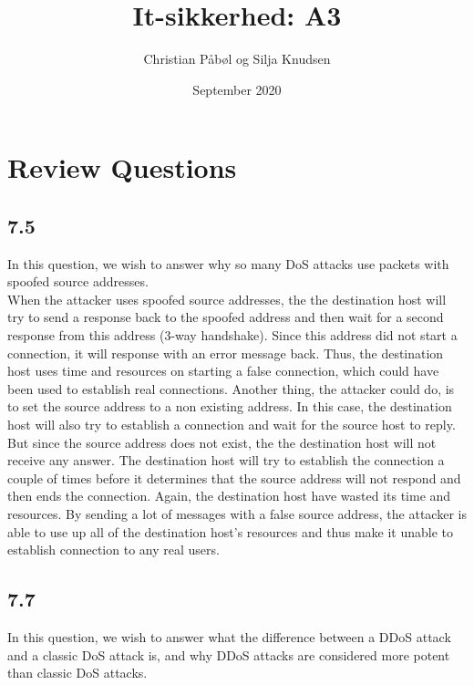 \documentclass{article}
\title{It-sikkerhed: A3}
\author{Christian Påbøl og Silja Knudsen }
\date{September 2020}
\begin{document}
\maketitle

\section{Review Questions}
\subsection{7.5}
In this question, we wish to answer why so many DoS attacks use packets with spoofed source addresses.\\

When the attacker uses spoofed source addresses, the the destination host will try to send a response back to the spoofed address and then wait for a second response from this address (3-way handshake). Since this address did not start a connection, it will response with an error message back. Thus, the destination host  uses time and resources on starting a false connection, which could have been used to establish real connections. 
Another thing, the attacker could do, is to set the source address to a non existing address. In this case, the destination host will also try to establish a connection and wait for the source host to reply. But since the source address does not exist, the the destination host will not receive any answer. The destination host will try to establish the connection a couple of times before it determines that the source address will not respond and then ends the connection. Again, the destination host have wasted its time and resources. By sending a lot of messages with a false source address, the attacker is able to use up all of the destination host's resources and thus make it unable to establish connection to any real users.


\subsection{7.7}
In this question, we wish to answer what the difference between a DDoS attack and a classic DoS attack is, and why DDoS attacks are considered more potent than classic DoS attacks.\\
\end{document}
